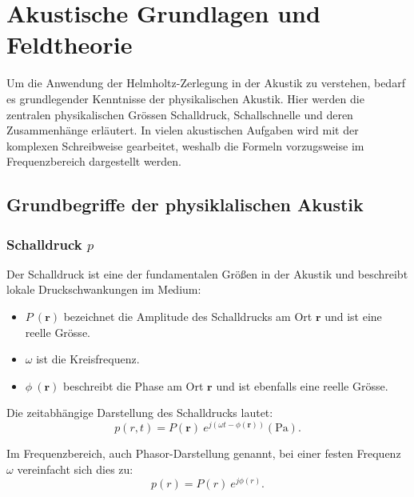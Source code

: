 %
%
%
%
\section{Akustische Grundlagen und Feldtheorie
\label{helmholtz:section:akustische_Grundlagen}}

Um die Anwendung der Helmholtz-Zerlegung in der Akustik zu verstehen, bedarf es grundlegender Kenntnisse der physikalischen Akustik. Hier werden die zentralen physikalischen Grössen Schalldruck, Schallschnelle und deren Zusammenhänge erläutert. In vielen akustischen Aufgaben wird mit der komplexen Schreibweise gearbeitet, weshalb die Formeln vorzugsweise im Frequenzbereich dargestellt werden.

\subsection{Grundbegriffe der physiklalischen Akustik
\label{helmholtz:subsection:Grundbegriffe_Akustik}}

\subsubsection{Schalldruck $p$}
 
Der Schalldruck ist eine der fundamentalen Größen in der Akustik und beschreibt lokale Druckschwankungen im Medium:
 
\begin{itemize}
\item $P \: (\boldsymbol{r})$ bezeichnet die Amplitude des Schalldrucks am Ort $\boldsymbol{r}$ und ist eine reelle Grösse.
\item $\omega$ ist die Kreisfrequenz.
\item $\phi \: (\boldsymbol{r})$ beschreibt die Phase am Ort $\boldsymbol{r}$ und ist ebenfalls eine reelle Grösse.
\end{itemize}
 
Die zeitabhängige Darstellung des Schalldrucks lautet:
\begin{equation}
p(r,t) = P(\boldsymbol{r}) \: e^{j( \omega t - \phi(\boldsymbol{r}))} (\si{\pascal}).
\end{equation}
 
Im Frequenzbereich, auch Phasor-Darstellung genannt, bei einer festen Frequenz $\omega$ vereinfacht sich dies zu:
\begin{equation}
p(r) = P(r) \: e^{j \phi (r)}.
\label{helmholtz:PhasorSchalldruck}
\end{equation}
 
